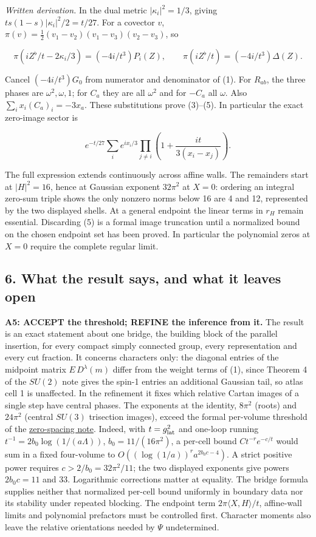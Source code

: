 \documentclass[11pt,a4paper]{article}
\begin{document}
\emph{Written derivation.} In the dual metric \(|\kappa_i|^2=1/3\),
giving \(ts(1-s)|\kappa_i|^2/2=t/27\). For a covector \(v\),
\(\pi(v)=\frac12(v_1-v_2)(v_1-v_3)(v_2-v_3)\), so

\[\pi(iZ^\flat/t-2\kappa_i/3)=(-4i/t^3)P_i(Z),
\qquad \pi(iZ^\flat/t)=(-4i/t^3)\Delta(Z).\]

Cancel \((-4i/t^3)G_0\) from numerator and denominator of (1). For
\(R_{ab}\), the three phases are \(\omega^2,\omega,1\); for \(C_a\) they
are all \(\omega^2\) and for \(-C_a\) all \(\omega\). Also
\(\sum_i x_i(C_a)_i=-3x_a\). These substitutions prove (3)--(5). In
particular the exact zero-image sector is

\[e^{-t/27}\sum_i e^{ix_i/3}
\prod_{j\ne i}\left(1+\frac{it}{3(x_i-x_j)}\right).\tag{6}\]

The full expression extends continuously across affine walls. The
remainders start at \(|H|^2=16\), hence at Gaussian exponent \(32\pi^2\)
at \(X=0\): ordering an integral zero-sum triple shows the only nonzero
norms below 16 are 4 and 12, represented by the two displayed shells. At
a general endpoint the linear terms in \(r_H\) remain essential.
Discarding (5) is a formal image truncation until a normalized bound on
the chosen endpoint set has been proved. In particular the polynomial
zeros at \(X=0\) require the complete regular limit.

\hypertarget{what-the-result-says-and-what-it-leaves-open}{%
\subsection{6. What the result says, and what it leaves
open}\label{what-the-result-says-and-what-it-leaves-open}}

\textbf{A5: ACCEPT the threshold; REFINE the inference from it.} The
result is an exact statement about one bridge, the building block of the
parallel insertion, for every compact simply connected group, every
representation and every cut fraction. It concerns characters only: the
diagonal entries of the midpoint matrix \(E\,D^\lambda(m)\) differ from
the weight terms of (1), since Theorem 4 of the \(SU(2)\) note gives the
spin-1 entries an additional Gaussian tail, so atlas cell 1 is
unaffected. In the refinement it fixes which relative Cartan images of a
single step have central phases. The exponents at the identity,
\(8\pi^2\) (roots) and \(24\pi^2\) (central \(SU(3)\) trisection
images), exceed the formal per-volume threshold of the
\href{zero-spacing-any-action.md}{zero-spacing note}. Indeed, with
\(t=g_{\rm lat}^2\) and one-loop running
\(t^{-1}=2b_0\log(1/(a\Lambda))\), \(b_0=11/(16\pi^2)\), a per-cell
bound \(Ct^{-r}e^{-c/t}\) would sum in a fixed four-volume to
\(O((\log(1/a))^r a^{2b_0c-4})\). A strict positive power requires
\(c>2/b_0=32\pi^2/11\); the two displayed exponents give powers
\(2b_0c=11\) and \(33\). Logarithmic corrections matter at equality. The
bridge formula supplies neither that normalized per-cell bound uniformly
in boundary data nor its stability under repeated blocking. The endpoint
term \(2\pi\langle X,H\rangle/t\), affine-wall limits and polynomial
prefactors must be controlled first. Character moments also leave the
relative orientations needed by \(\Psi\) undetermined.
\end{document}
